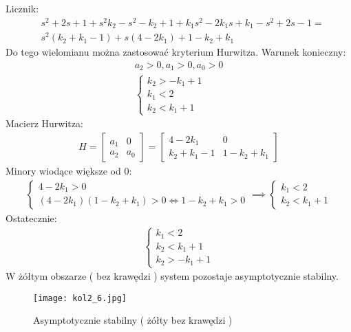 \documentclass[a4paper,11pt]{article}
\begin{document}
Licznik:
\begin{align*}
&s^{2}+2s+1+s^{2}k_{2}-s^{2}-k_{2}+1+k_{1}s^{2}-2k_{1}s+k_{1}-s^{2}+2s-1 = \\
&s^{2}(k_{2}+k_{1}-1)+s(4-2k_{1})+1-k_{2}+k_{1}
\end{align*} 
Do tego wielomianu można zastosować kryterium Hurwitza. Warunek konieczny:
\begin{align*}
a_{2} > 0, a_{1}>0, a_{0}>0 \\
\begin{cases}
k_{2}>-k_{1}+1 \\
k_{1}<2 \\
k_{2}<k_{1}+1
\end{cases}
\end{align*}
Macierz Hurwitza:
\begin{align*}
H = 
\begin{bmatrix}
a_{1} & 0 \\
a_{2} & a_{0}
\end{bmatrix}
=
\begin{bmatrix}
4-2k_{1} & 0 \\
k_{2}+k_{1}-1 & 1-k_{2}+k_{1}
\end{bmatrix}
\end{align*}
Minory wiodące większe od 0:
\begin{align*}
\begin{cases}
4-2k_{1}>0 \\
(4-2k_{1})(1-k_{2}+k_{1})>0 \Leftrightarrow 1-k_{2}+k_{1}>0
\end{cases}
\implies
\begin{cases}
k_{1}<2 \\
k_{2}<k_{1}+1
\end{cases}
\end{align*}
Ostatecznie:
\begin{align*}
\begin{cases}
k_{1}<2 \\
k_{2}<k_{1}+1 \\
k_{2} > -k_{1}+1
\end{cases}
\end{align*}
W żółtym obszarze ( bez krawędzi ) system pozostaje asymptotycznie stabilny.
\begin{figure}[H]
\centerline{\texttt{[image: kol2\_6.jpg]}}
\caption{Asymptotycznie stabilny ( żółty bez krawędzi )}
\label{fig:kol2_6}
\end{figure}
\end{document}

